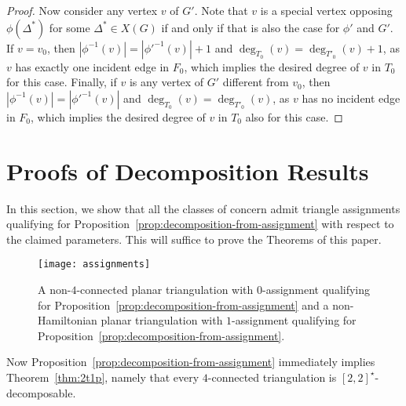 \documentclass[a4paper,10pt]{article}
\theoremstyle{plain}
\begin{document}
\begin{proof}
 Now consider any vertex $v$ of $G'$.
 Note that $v$ is a special vertex opposing $\phi(\Delta^*)$ for some $\Delta^* \in X(G)$ if and only if that is also the case for $\phi'$ and $G'$.
 If $v = v_0$, then $|\phi^{-1}(v)| = |\phi'^{-1}(v)| + 1$ and $\deg_{T_0}(v) = \deg_{T'_0}(v) + 1$, as $v$ has exactly one incident edge in $F_0$, which implies the desired degree of $v$ in $T_0$ for this case.
 Finally, if $v$ is any vertex of $G'$ different from $v_0$, then $|\phi^{-1}(v)| = |\phi'^{-1}(v)|$ and $\deg_{T_0}(v) = \deg_{T'_0}(v)$, as $v$ has no incident edge in $F_0$, which implies the desired degree of $v$ in $T_0$ also for this case.
\end{proof}

























\section{Proofs of Decomposition Results}\label{sec:proofs}

In this section, we show that all the classes of concern admit triangle assignments qualifying for Proposition~\ref{prop:decomposition-from-assignment} with respect to the claimed parameters. This will suffice to prove the Theorems of this paper.

\begin{figure}[tb]
 \centering
 \texttt{[image: assignments]}
 \caption{A non-$4$-connected planar triangulation with $0$-assignment qualifying for Proposition~\ref{prop:decomposition-from-assignment} and a non-Hamiltonian planar triangulation with $1$-assignment qualifying for Proposition~\ref{prop:decomposition-from-assignment}.}
 \label{fig:christmas-tree}
\end{figure}

Now Proposition~\ref{prop:decomposition-from-assignment} immediately implies Theorem~\ref{thm:2t1p}, namely that every $4$-connected triangulation is $[2,2]^\star$-decomposable.
\end{document}
